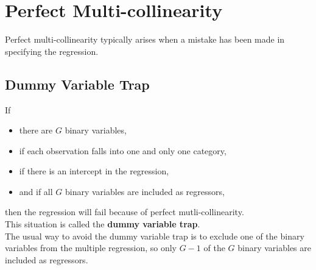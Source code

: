 \section{Perfect Multi-collinearity}
Perfect multi-collinearity typically arises when a mistake has been made in specifying the regression.

\subsection{Dummy Variable Trap}
If 
\begin{itemize}
	\item there are $G$ binary variables,
	\item if each observation falls into one and only one category,
	\item if there is an intercept in the regression,
	\item and if all $G$ binary variables are included as regressors, 
\end{itemize}
then the regression will fail because of perfect mutli-collinearity.\\
This situation is called the \textbf{\color{blue}dummy variable trap}.\\
The usual way to avoid the dummy variable trap is to exclude one of the binary variables from the multiple regression, so only $G - 1$ of the $G$ binary variables are included as regressors.

